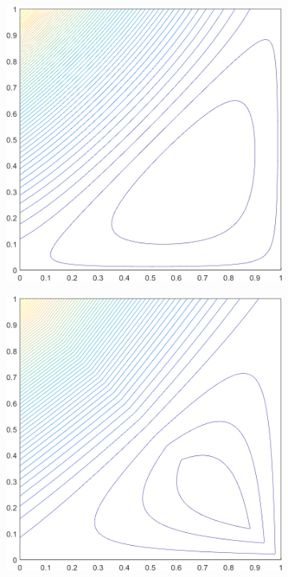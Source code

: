\begin{figure}
\label{fig::2D_Quadratic_Summary_unit_square_basis_functions_BF4}
\centering
	\begin{subfigure}[b]{0.39\textwidth}
		\centering
		\includegraphics[width=\textwidth]{figures/sec_BF/square_WACHSPRESS2_contour_b4.png}
		\caption{}
	\end{subfigure}
	\hspace{1.5cm}
	\begin{subfigure}[b]{0.39\textwidth}
		\centering
		\includegraphics[width=\textwidth]{figures/sec_BF/square_PWLD2_contour_b4.png}

\end{subfigure}
\end{figure}

